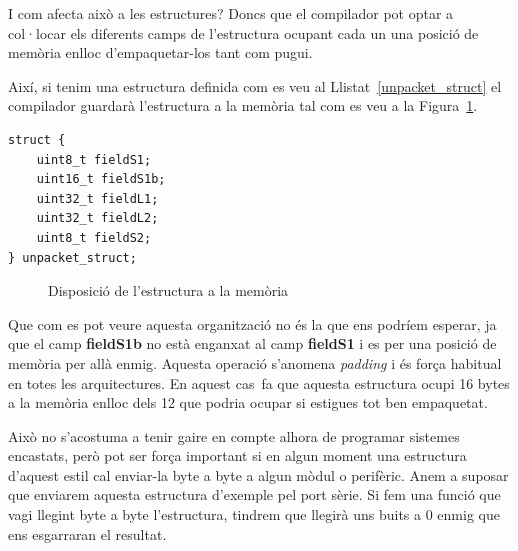 I com afecta això a les estructures? Doncs que el compilador pot optar a col·locar els diferents camps de l'estructura ocupant cada un una posició de memòria enlloc d'empaquetar-los tant com pugui.

Així, si tenim una estructura definida com es veu al Llistat~\ref{unpacket_struct} el compilador guardarà l'estructura a la memòria tal com es veu a la Figura~\ref{fig:UnpackedMemoryStructure}. 

\begin{lstlisting}[style=customc,caption={Estructura d'exemple},label=unpacket_struct]
 struct {
	uint8_t fieldS1;
	uint16_t fieldS1b;
	uint32_t fieldL1;
	uint32_t fieldL2;
	uint8_t fieldS2;
} unpacket_struct;
\end{lstlisting}


\begin{figure}
 \centering
 \caption{Disposició de l'estructura a la memòria}
 \label{fig:UnpackedMemoryStructure}
\end{figure}

Que com es pot veure aquesta organització no és la que ens podríem esperar, ja que el camp {\bf fieldS1b} no està enganxat al camp {\bf fieldS1} i es per una posició de memòria per allà enmig. Aquesta operació s'anomena {\em padding} i és força habitual en totes les arquitectures. En aquest cas fa que aquesta estructura ocupi 16 bytes a la memòria enlloc dels 12 que podria ocupar si estigues tot ben empaquetat.

Això no s'acostuma a tenir gaire en compte alhora de programar sistemes encastats, però pot ser força important si en algun moment una estructura d'aquest estil cal enviar-la byte a byte a algun mòdul o perifèric. Anem a suposar que enviarem aquesta estructura d'exemple pel port sèrie. Si fem una funció que vagi llegint byte a byte l'estructura, tindrem que llegirà uns buits a 0 enmig que ens esgarraran el resultat.

